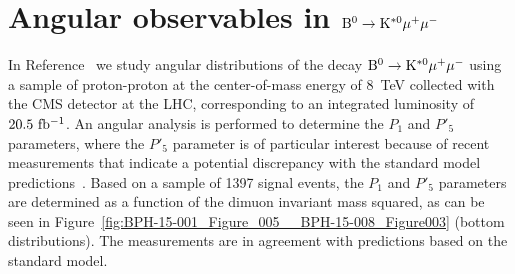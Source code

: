 \documentclass{PoS}
\begin{document}
\section{Angular observables in ${\rm B^0 \to K^{*0}\mu^+\mu^-}$}

In Reference~\cite{bph-15-008} we study angular distributions of the decay
${\rm B^0 \to K^{*0}\mu^+\mu^-}$ using a sample of proton-proton at the
center-of-mass energy of 8~TeV collected with the CMS detector at the LHC,
corresponding to an integrated luminosity of ${\rm 20.5~fb^{-1}}$. An
angular analysis is performed to determine the $P_1$ and $P'_5$ parameters,
where the $P'_5$ parameter is of particular interest because of recent
measurements that indicate a potential discrepancy with the standard model
predictions~\cite{LHCb,Belle}. Based on a sample of 1397 signal events, the
$P_1$ and $P'_5$ parameters are determined as a function of the dimuon invariant
mass squared, as can be seen in
Figure~\ref{fig:BPH-15-001_Figure_005__BPH-15-008_Figure003}
(bottom distributions). The measurements are in agreement with predictions
based on the standard model.
\end{document}

